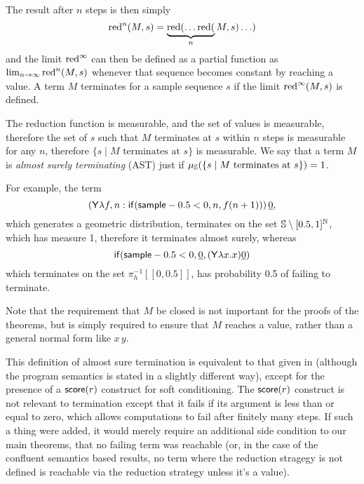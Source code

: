 The result after $n$ steps is then simply 
\[
\operatorname{red}^n(M,s) = \underbrace{\operatorname{red}(\ldots\operatorname{red}(}_n M,s)\ldots)
\] 
and the limit $\operatorname{red}^\infty$ can then be defined as a partial function as $\lim_{n \to \infty} \operatorname{red}^n(M,s)$ whenever that sequence becomes constant by reaching a value. A term $M$ terminates for a sample sequence $s$ if the limit $\operatorname{red}^\infty(M,s)$ is defined.

The reduction function is measurable, and the set of values is measurable, therefore the set of $s$ such that $M$ terminates at $s$ within $n$ steps is measurable for any $n$, therefore $\{s \mid M \text{ terminates at } s \}$ is measurable. 
We say that a term $M$ is \emph{almost surely terminating} (AST) just if $\mu_{{\mathbb{S}}}(\{s \mid M \text{ terminates at } s\}) = 1$.

\iffalse
\lo{Alternatively, define the \emph{runtime of $M$} to be the random variable 
\[
T_M(s) := 
\begin{cases}
\min \set{n \mid \pi_0(\red^n(M, s)) \textrm{ is a value}} & \hbox{if $\red^\infty(M,s)$ is defined}\\
\infty & \hbox{otherwise}
\end{cases}
\]
Equivalently, we say that $M$ is \emph{almost surely terminating} (AST) if $T_M < \infty$ a.s.; 
and $M$ is \emph{positively almost surely terminating} (PAST) if $\expect{T_M} < \infty$.}
\fi
For example, the term 
\[
(\mathsf{Y} \lambda f, n: \mathsf{if}(\mathsf{sample} - 0.5 < 0, n, f (n+1)) ) \, \underline{0},
\] 
which generates a geometric distribution, terminates on the set ${\mathbb{S}} \setminus [0.5,1]^\mathbb N$, which has measure 1, therefore it terminates almost surely, whereas 
\[
\mathsf{if}(\mathsf{sample} - 0.5 < 0, \underline 0, (\mathsf{Y} \lambda x. x) \underline 0)
\] 
which terminates on the set $\pi_h^{-1}[[0,0.5]]$, has probability 0.5 of failing to terminate.

Note that the requirement that $M$ be closed is not important for the proofs of the theorems, but is simply required to ensure that $M$ reaches a value, rather than a general normal form like $x \, y$.

\begin{remark}
\label{rem:score}
This definition of almost sure termination is equivalent to that given in \citep{MakOPW21} (although the program semantics is stated in a slightly different way), except for the presence of a $\mathsf{score}(r)$ construct for soft conditioning. 
The $\mathsf{score}(r)$ construct is not relevant to termination except that it fails if its argument is less than or equal to zero, which allows computations to fail after finitely many steps. 
If such a thing were added, it would merely require an additional side condition to our main theorems, that no failing term was reachable (or, in the case of the confluent semantics based results, no term where the reduction stragegy is not defined is reachable via the reduction strategy unless it's a value).
\end{remark}

